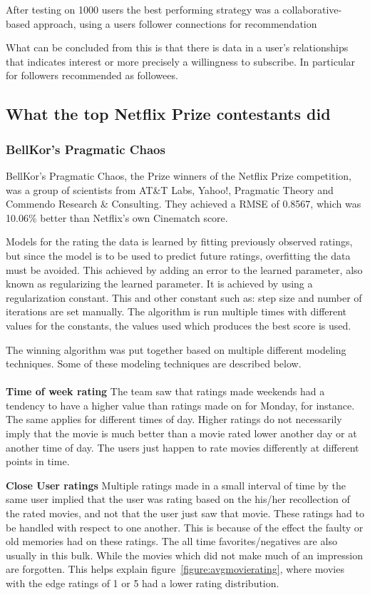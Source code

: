 After testing on 1000 users the best performing strategy was a collaborative-based approach, using a users follower connections for recommendation

What can be concluded from this is that there is data in a user's relationships that indicates interest or more precisely a willingness to subscribe. In particular for followers recommended as followees.


\subsection{What the top Netflix Prize contestants did}\label{subsec:thewinners}
\subsubsection{BellKor's Pragmatic Chaos}
BellKor's Pragmatic Chaos, the Prize winners of the Netflix Prize competition, was a group of scientists from AT\&T Labs, Yahoo!, Pragmatic Theory and Commendo Research \& Consulting. They achieved a RMSE of 0.8567, which was 10.06\% better than Netflix's own Cinematch score.

Models for the rating the data is learned by fitting previously observed ratings, but since the model is to be used to predict future ratings, overfitting the data must be avoided. This achieved by adding an error to the learned parameter, also known as regularizing the learned parameter. It is achieved by using a regularization constant. This and other constant such as: step size and number of iterations are set manually. The algorithm is run multiple times with different values for the constants, the values used which produces the best score is used. \cite{BellKor-CF-TD}

The winning algorithm was put together based on multiple different modeling techniques. Some of these modeling techniques are described below. \\\\


\textbf{Time of week rating}  The team saw that ratings made weekends had a tendency to have a higher value than ratings made on for Monday, for instance. The same applies for different times of day. Higher ratings do not necessarily imply that the movie is much better than a movie rated lower another day or at another time of day. The users just happen to rate movies differently at different points in time.

\textbf{Close User ratings} Multiple ratings made in a small interval of time by the same user implied that the user was rating based on the his/her recollection of the rated movies, and not that the user just saw that movie. These ratings had to be handled with respect to one another. This is because of the effect the faulty or old memories had on these ratings. The all time favorites/negatives are also usually in this bulk. While the movies which did not make much of an impression are forgotten. This helps explain figure~\ref{figure:avgmovierating}, where movies with the edge ratings of 1 or 5 had a lower rating distribution.

